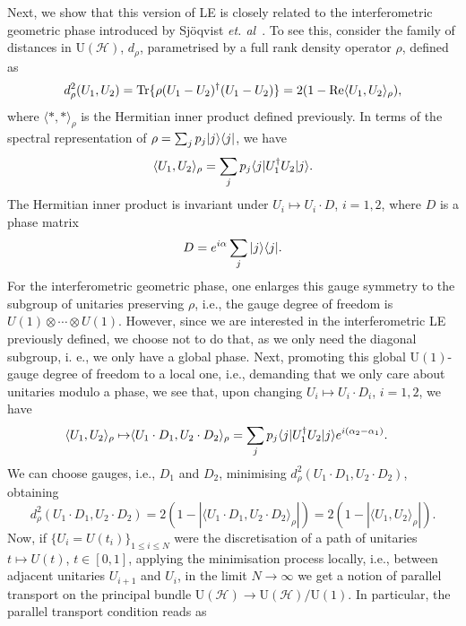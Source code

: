 Next, we show that this version of LE is closely related to the interferometric geometric phase introduced by Sj\"{o}qvist \emph{ et. al}~\cite{sjo:pat:eke:ana:eri:oi:ved:00,ton:sjo:kwe:oh}. To see this, consider the family of distances in $\text{U}(\mathscr{H})$, $d_{\rho}$, parametrised by a full rank density operator $\rho$, defined as
\begin{equation*}
d^2_{\rho}(U_1,U_2)=\text{Tr}\{\rho (U_1-U_2)^{\dagger}(U_1-U_2)\}=2(1-\text{Re}\langle U_1, U_2\rangle_{\rho}),
\end{equation*}
where $\langle \ast , \ast \rangle_{\rho}$ is the Hermitian inner product defined previously. In terms of the spectral representation of $\rho=\sum_{j}p_j| j \rangle\langle j |$, we have
\begin{equation*}
\langle U_1, U_2\rangle_{\rho}=\sum_{j}p_j\langle j | U_1^{\dagger} U_2 | j \rangle.
\end{equation*}
The Hermitian inner product is invariant under $U_{i}\mapsto U_{i}\cdot D$, $i=1,2$, where $D$ is a phase matrix
\begin{equation*}
D=e^{i\alpha}\sum_{j}| j \rangle\langle j |.
\end{equation*}
For the interferometric geometric phase, one enlarges this gauge symmetry to the subgroup of unitaries preserving $\rho$, i.e., the gauge degree of freedom is $U(1)\otimes\cdots\otimes U(1)$. However, since we are interested in the interferometric LE previously defined, we choose not to do that, as we only need the diagonal subgroup, i. e., we only have a global phase. Next, promoting this global $\text{U}(1)$-gauge degree of freedom to a local one, i.e., demanding that we only care about unitaries modulo a phase, we see that, upon changing $U_i\mapsto U_i\cdot D_i$, $i=1,2$,  we have
\begin{eqnarray*}
\langle U_1, U_2\rangle_{\rho}\mapsto & \langle U_1\cdot D_1, U_2\cdot D_2\rangle_{\rho}=\sum_{j}p_j\langle j | U_1^{\dagger} U_2 | j \rangle e^{i(\alpha_{2}-\alpha_{1})}.
\end{eqnarray*}
We can choose gauges, i.e., $D_1$ and $D_2$, minimising $d^2_{\rho}(U_1\cdot D_1,U_2\cdot D_2)$, obtaining
\begin{equation*}
d^2_{\rho}(U_1\cdot D_1, U_2\cdot D_2)=2(1-|\langle U_1\cdot D_1,U_2\cdot D_2\rangle_\rho|)
=2(1-|\langle U_1,U_2\rangle_\rho|).
\end{equation*}
Now, if $\{U_i=U(t_i)\}_{1\leq i\leq N}$ were the discretisation of a path of unitaries $t\mapsto U(t)$, $t\in[0,1]$, applying the minimisation process locally, i.e., between adjacent unitaries $U_{i+1}$ and $U_i$, in the limit $N\to \infty$ we get a notion of parallel transport on the principal bundle $\text{U}(\mathscr{H})\to \text{U}(\mathscr{H})/\text{U}(1)$. In particular, the parallel transport condition reads as
